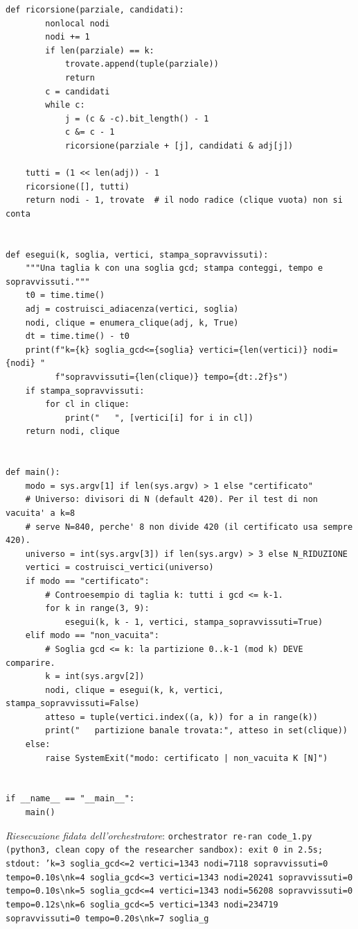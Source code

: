 \documentclass[11pt,a4paper]{article}
\begin{document}
\begin{lstlisting}[caption={attempt\_001 code\_1 [python, rigore exact] — Implementation 1 (certificate): exhaustive enumeration of all k-cliques in G\_k on the 1343 — approvato dal Referee}]
    def ricorsione(parziale, candidati):
        nonlocal nodi
        nodi += 1
        if len(parziale) == k:
            trovate.append(tuple(parziale))
            return
        c = candidati
        while c:
            j = (c & -c).bit_length() - 1
            c &= c - 1
            ricorsione(parziale + [j], candidati & adj[j])

    tutti = (1 << len(adj)) - 1
    ricorsione([], tutti)
    return nodi - 1, trovate  # il nodo radice (clique vuota) non si conta


def esegui(k, soglia, vertici, stampa_sopravvissuti):
    """Una taglia k con una soglia gcd; stampa conteggi, tempo e sopravvissuti."""
    t0 = time.time()
    adj = costruisci_adiacenza(vertici, soglia)
    nodi, clique = enumera_clique(adj, k, True)
    dt = time.time() - t0
    print(f"k={k} soglia_gcd<={soglia} vertici={len(vertici)} nodi={nodi} "
          f"sopravvissuti={len(clique)} tempo={dt:.2f}s")
    if stampa_sopravvissuti:
        for cl in clique:
            print("   ", [vertici[i] for i in cl])
    return nodi, clique


def main():
    modo = sys.argv[1] if len(sys.argv) > 1 else "certificato"
    # Universo: divisori di N (default 420). Per il test di non vacuita' a k=8
    # serve N=840, perche' 8 non divide 420 (il certificato usa sempre 420).
    universo = int(sys.argv[3]) if len(sys.argv) > 3 else N_RIDUZIONE
    vertici = costruisci_vertici(universo)
    if modo == "certificato":
        # Controesempio di taglia k: tutti i gcd <= k-1.
        for k in range(3, 9):
            esegui(k, k - 1, vertici, stampa_sopravvissuti=True)
    elif modo == "non_vacuita":
        # Soglia gcd <= k: la partizione 0..k-1 (mod k) DEVE comparire.
        k = int(sys.argv[2])
        nodi, clique = esegui(k, k, vertici, stampa_sopravvissuti=False)
        atteso = tuple(vertici.index((a, k)) for a in range(k))
        print("   partizione banale trovata:", atteso in set(clique))
    else:
        raise SystemExit("modo: certificato | non_vacuita K [N]")


if __name__ == "__main__":
    main()

\end{lstlisting}
\noindent\emph{Riesecuzione fidata dell'orchestratore}: \texttt{orchestrator re-ran code\_1.py (python3, clean copy of the researcher sandbox): exit 0 in 2.5s; stdout: 'k=3 soglia\_gcd\textless{}=2 vertici=1343 nodi=7118 sopravvissuti=0 tempo=0.10s\textbackslash{}nk=4 soglia\_gcd\textless{}=3 vertici=1343 nodi=20241 sopravvissuti=0 tempo=0.10s\textbackslash{}nk=5 soglia\_gcd\textless{}=4 vertici=1343 nodi=56208 sopravvissuti=0 tempo=0.12s\textbackslash{}nk=6 soglia\_gcd\textless{}=5 vertici=1343 nodi=234719 sopravvissuti=0 tempo=0.20s\textbackslash{}nk=7 soglia\_g}
\end{document}
